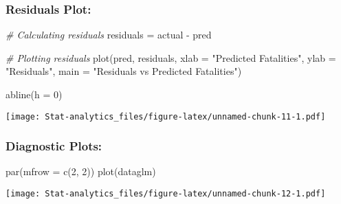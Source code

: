 \documentclass[
]{article}
\newenvironment{Shaded}{\begin{snugshade}}{\end{snugshade}}
\newcommand{\AttributeTok}[1]{\textcolor[rgb]{0.77,0.63,0.00}{#1}}
\newcommand{\CommentTok}[1]{\textcolor[rgb]{0.56,0.35,0.01}{\textit{#1}}}
\newcommand{\DecValTok}[1]{\textcolor[rgb]{0.00,0.00,0.81}{#1}}
\newcommand{\FunctionTok}[1]{\textcolor[rgb]{0.00,0.00,0.00}{#1}}
\newcommand{\NormalTok}[1]{#1}
\newcommand{\OtherTok}[1]{\textcolor[rgb]{0.56,0.35,0.01}{#1}}
\newcommand{\SpecialCharTok}[1]{\textcolor[rgb]{0.00,0.00,0.00}{#1}}
\newcommand{\StringTok}[1]{\textcolor[rgb]{0.31,0.60,0.02}{#1}}
\begin{document}
\hypertarget{residuals-plot}{%
\subsubsection{Residuals Plot:}\label{residuals-plot}}

\begin{Shaded}
\begin{Highlighting}[]
\CommentTok{\# Calculating residuals}
\NormalTok{residuals }\OtherTok{=}\NormalTok{ actual }\SpecialCharTok{{-}}\NormalTok{ pred}

\CommentTok{\# Plotting residuals}
\FunctionTok{plot}\NormalTok{(pred, residuals, }\AttributeTok{xlab =} \StringTok{"Predicted Fatalities"}\NormalTok{, }\AttributeTok{ylab =} \StringTok{"Residuals"}\NormalTok{, }\AttributeTok{main =} \StringTok{"Residuals vs Predicted Fatalities"}\NormalTok{)}

\FunctionTok{abline}\NormalTok{(}\AttributeTok{h =} \DecValTok{0}\NormalTok{)}
\end{Highlighting}
\end{Shaded}

\texttt{[image: Stat-analytics\_files/figure-latex/unnamed-chunk-11-1.pdf]}

\hypertarget{diagnostic-plots}{%
\subsubsection{Diagnostic Plots:}\label{diagnostic-plots}}

\begin{Shaded}
\begin{Highlighting}[]
\FunctionTok{par}\NormalTok{(}\AttributeTok{mfrow =} \FunctionTok{c}\NormalTok{(}\DecValTok{2}\NormalTok{, }\DecValTok{2}\NormalTok{))}
\FunctionTok{plot}\NormalTok{(dataglm)}
\end{Highlighting}
\end{Shaded}

\texttt{[image: Stat-analytics\_files/figure-latex/unnamed-chunk-12-1.pdf]}
\end{document}
